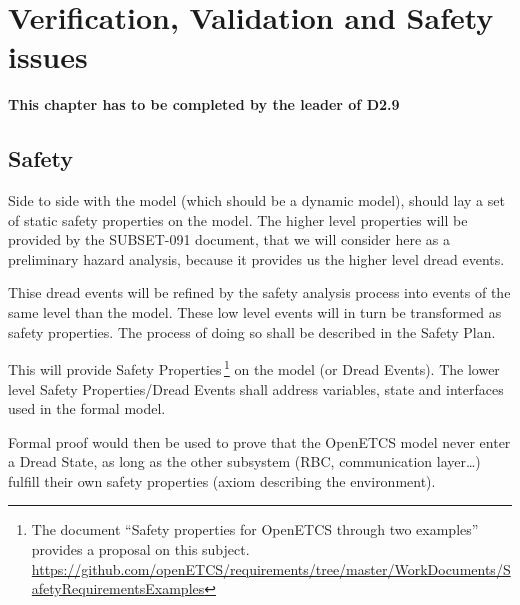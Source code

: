\documentclass{template/openetcs_article}
\begin{document}



\section{Verification, Validation and Safety issues}
\textbf{This chapter has to be completed by the leader of D2.9}
\subsection{Safety}
\label{safety}
\begin{justif}
Side to side with the model (which should be a dynamic model), should lay a set of  
static safety properties on the model. The higher level properties will be provided 
by the SUBSET-091 document, that we will consider here as a preliminary hazard analysis, because 
it provides us the higher level dread events.

Thise dread events will be refined by the safety analysis process into events of the same 
level than the model. These low level events will in turn be transformed as safety properties.
The process of doing so shall be described in the Safety Plan.

This will provide Safety Properties\,\footnote{The document ``Safety properties for OpenETCS through
two examples'' provides a proposal on this subject. 
\url{https://github.com/openETCS/requirements/tree/master/WorkDocuments/SafetyRequirementsExamples}} 
on the model (or Dread Events). The lower level Safety Properties/Dread Events shall address variables,
state and interfaces used in the formal model.

Formal proof would then be used to prove that the OpenETCS model never enter a Dread State, 
as long as the other subsystem (RBC, communication layer\dots) fulfill their own safety properties
(axiom describing the environment).
\end{justif}
\end{document}
